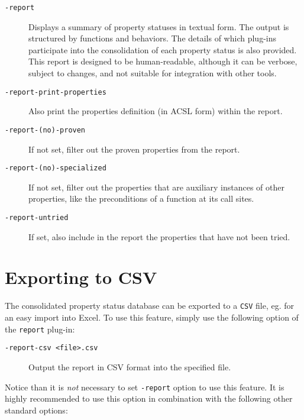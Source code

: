 \begin{description}

\item[\tt -report] Displays a summary of property statuses in textual form.
  The output is structured by functions and behaviors. The details of which plug-ins participate
  into the consolidation of each property status is also provided.
  This report is designed to be human-readable, although it can be verbose, subject to changes, and
  not suitable for integration with other tools.

\item[\tt -report-print-properties] Also print the properties definition (in ACSL form) within the
  report.

\item[\tt -report-(no)-proven] If not set, filter out the proven properties from the report.
\item[\tt -report-(no)-specialized] If not set, filter out the properties that are auxiliary instances of other properties,
  like the preconditions of a function at its call sites.
\item[\tt -report-untried] If set, also include in the report the properties that have not been tried.

\end{description}


\section{Exporting to CSV}

The consolidated property status database can be exported to a \texttt{CSV} file, eg. for an easy import into Excel.
To use this feature, simply use the following option of the \texttt{report} plug-in:

\begin{description}
\item[\tt -report-csv <file>.csv] Output the report in CSV format into the specified file.
\end{description}

Notice than it is \emph{not} necessary to set \texttt{-report} option to use this feature.
It is highly recommended to use this option in combination with the following other
standard \FramaC options:

